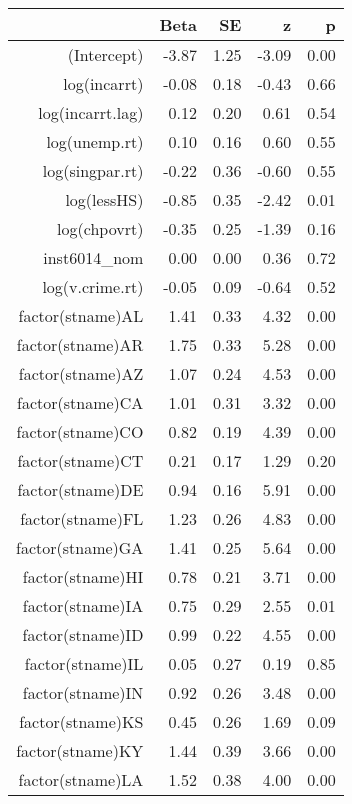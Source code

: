 \begin{table}[ht]
\centering
\begin{tabular}{rrrrr}
  \hline
 & Beta & SE & z & p \\ 
  \hline
(Intercept) & -3.87 & 1.25 & -3.09 & 0.00 \\ 
  log(incarrt) & -0.08 & 0.18 & -0.43 & 0.66 \\ 
  log(incarrt.lag) & 0.12 & 0.20 & 0.61 & 0.54 \\ 
  log(unemp.rt) & 0.10 & 0.16 & 0.60 & 0.55 \\ 
  log(singpar.rt) & -0.22 & 0.36 & -0.60 & 0.55 \\ 
  log(lessHS) & -0.85 & 0.35 & -2.42 & 0.01 \\ 
  log(chpovrt) & -0.35 & 0.25 & -1.39 & 0.16 \\ 
  inst6014\_nom & 0.00 & 0.00 & 0.36 & 0.72 \\ 
  log(v.crime.rt) & -0.05 & 0.09 & -0.64 & 0.52 \\ 
  factor(stname)AL & 1.41 & 0.33 & 4.32 & 0.00 \\ 
  factor(stname)AR & 1.75 & 0.33 & 5.28 & 0.00 \\ 
  factor(stname)AZ & 1.07 & 0.24 & 4.53 & 0.00 \\ 
  factor(stname)CA & 1.01 & 0.31 & 3.32 & 0.00 \\ 
  factor(stname)CO & 0.82 & 0.19 & 4.39 & 0.00 \\ 
  factor(stname)CT & 0.21 & 0.17 & 1.29 & 0.20 \\ 
  factor(stname)DE & 0.94 & 0.16 & 5.91 & 0.00 \\ 
  factor(stname)FL & 1.23 & 0.26 & 4.83 & 0.00 \\ 
  factor(stname)GA & 1.41 & 0.25 & 5.64 & 0.00 \\ 
  factor(stname)HI & 0.78 & 0.21 & 3.71 & 0.00 \\ 
  factor(stname)IA & 0.75 & 0.29 & 2.55 & 0.01 \\ 
  factor(stname)ID & 0.99 & 0.22 & 4.55 & 0.00 \\ 
  factor(stname)IL & 0.05 & 0.27 & 0.19 & 0.85 \\ 
  factor(stname)IN & 0.92 & 0.26 & 3.48 & 0.00 \\ 
  factor(stname)KS & 0.45 & 0.26 & 1.69 & 0.09 \\ 
  factor(stname)KY & 1.44 & 0.39 & 3.66 & 0.00 \\ 
  factor(stname)LA & 1.52 & 0.38 & 4.00 & 0.00 \\ 

\end{tabular}
\end{table}
